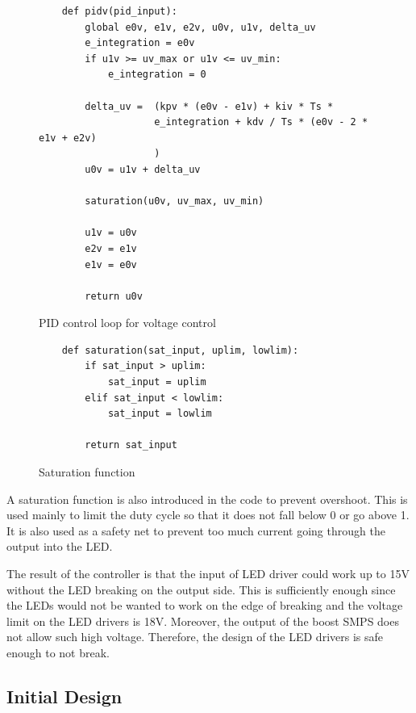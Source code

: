 \begin{figure}
    \footnotesize

    \begin{verbatim}
    def pidv(pid_input):
        global e0v, e1v, e2v, u0v, u1v, delta_uv
        e_integration = e0v
        if u1v >= uv_max or u1v <= uv_min:
            e_integration = 0

        delta_uv =  (kpv * (e0v - e1v) + kiv * Ts * 
                    e_integration + kdv / Ts * (e0v - 2 * e1v + e2v)
                    )  
        u0v = u1v + delta_uv

        saturation(u0v, uv_max, uv_min)

        u1v = u0v
        e2v = e1v
        e1v = e0v

        return u0v
    \end{verbatim}
    \caption{PID control loop for voltage control}
    \label{code:pidv}
\end{figure}

\begin{figure}
    \footnotesize
    \begin{verbatim}
    def saturation(sat_input, uplim, lowlim):
        if sat_input > uplim:
            sat_input = uplim
        elif sat_input < lowlim:
            sat_input = lowlim

        return sat_input
    \end{verbatim}
    \caption{Saturation function}
    \label{code:saturation}
\end{figure}

A saturation function is also introduced in the code to prevent overshoot. This is used mainly to limit the duty cycle so that it does not fall below 0 or go above 1. It is also used as a safety net to prevent too much current going through the output into the LED.

The result of the controller is that the input of LED driver could work up to 15V without the LED breaking on the output side. This is sufficiently enough since the LEDs would not be wanted to work on the edge of breaking and the voltage limit on the LED drivers is 18V. Moreover, the output of the boost SMPS does not allow such high voltage. Therefore, the design of the LED drivers is safe enough to not break.

\subsection{Initial Design}


